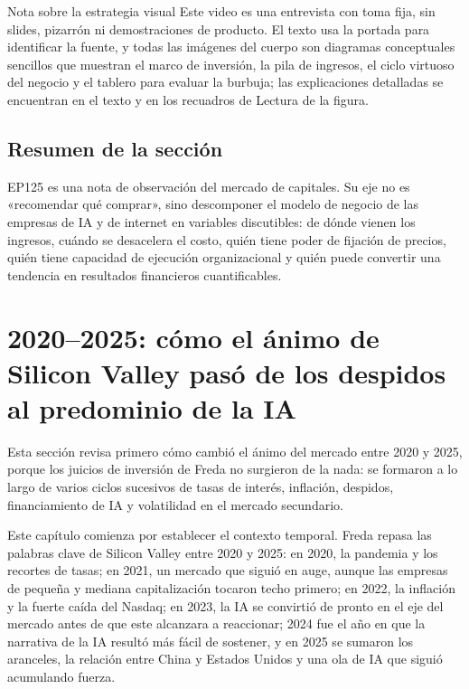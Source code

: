 \documentclass[a4paper]{article}
\begin{document}
\begin{knowledgebox}{Nota sobre la estrategia visual}
Este video es una entrevista con toma fija, sin slides, pizarrón ni demostraciones de producto. El texto usa la portada para identificar la fuente, y todas las imágenes del cuerpo son diagramas conceptuales sencillos que muestran el marco de inversión, la pila de ingresos, el ciclo virtuoso del negocio y el tablero para evaluar la burbuja; las explicaciones detalladas se encuentran en el texto y en los recuadros de Lectura de la figura.
\end{knowledgebox}

\subsection{Resumen de la sección}

EP125 es una nota de observación del mercado de capitales. Su eje no es «recomendar qué comprar», sino descomponer el modelo de negocio de las empresas de IA y de internet en variables discutibles: de dónde vienen los ingresos, cuándo se desacelera el costo, quién tiene poder de fijación de precios, quién tiene capacidad de ejecución organizacional y quién puede convertir una tendencia en resultados financieros cuantificables.

\section{2020--2025: cómo el ánimo de Silicon Valley pasó de los despidos al predominio de la IA}

Esta sección revisa primero cómo cambió el ánimo del mercado entre 2020 y 2025, porque los juicios de inversión de Freda no surgieron de la nada: se formaron a lo largo de varios ciclos sucesivos de tasas de interés, inflación, despidos, financiamiento de IA y volatilidad en el mercado secundario.

Este capítulo comienza por establecer el contexto temporal. Freda repasa las palabras clave de Silicon Valley entre 2020 y 2025: en 2020, la pandemia y los recortes de tasas; en 2021, un mercado que siguió en auge, aunque las empresas de pequeña y mediana capitalización tocaron techo primero; en 2022, la inflación y la fuerte caída del Nasdaq; en 2023, la IA se convirtió de pronto en el eje del mercado antes de que este alcanzara a reaccionar; 2024 fue el año en que la narrativa de la IA resultó más fácil de sostener, y en 2025 se sumaron los aranceles, la relación entre China y Estados Unidos y una ola de IA que siguió acumulando fuerza.
\end{document}
